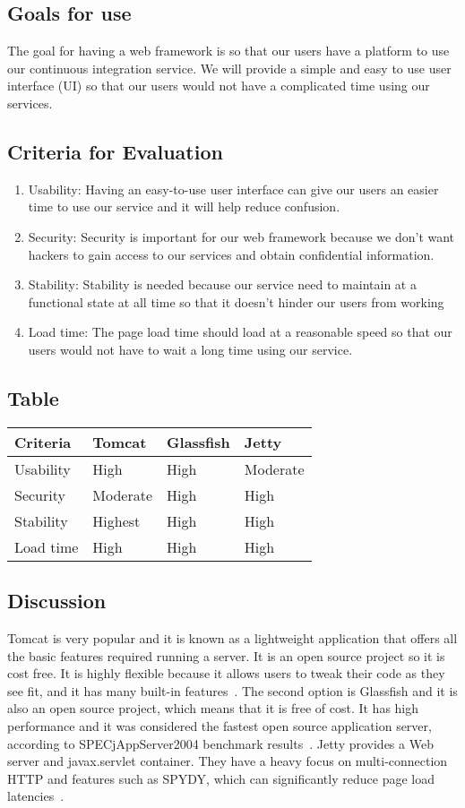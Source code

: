 \documentclass[10pt,letterpaper,onecolumn,journal]{IEEEtran}
\begin{document}
\subsection{Goals for use}
The goal for having a web framework is so that our users have a platform to use our continuous integration service.
We will provide a simple and easy to use user interface (UI) so that our users would not have a complicated time using our services.
\subsection{Criteria for Evaluation}
\begin{enumerate}
  \item Usability: Having an easy-to-use user interface can give our users an easier time to use our service and it will help reduce confusion.
  \item Security: Security is important for our web framework because we don't want hackers to gain access to our services and obtain confidential information.
  \item Stability: Stability is needed because our service need to maintain at a functional state at all time so that it doesn't hinder our users from working
  \item Load time: The page load time should load at a reasonable speed so that our users would not have to wait a long time using our service.
\end{enumerate}
\subsection{Table}
\begin{center}
  \begin{tabular}{llll}
    Criteria & Tomcat & Glassfish & Jetty \\ \midrule
    Usability       & High & High & Moderate \\ \midrule
    Security           & Moderate & High & High \\ \midrule
    Stability      & Highest & High & High \\ \midrule
    Load time  & High & High & High \\ \bottomrule
  \end{tabular}
\end{center}
\subsection{Discussion}
Tomcat is very popular and it is known as a lightweight application that offers all the basic features required running a server.
It is an open source project so it is cost free.
It is highly flexible because it allows users to tweak their code as they see fit, and it has many built-in features~\cite{tomcat}.
The second option is Glassfish and it is also an open source project, which means that it is free of cost.
It has high performance and it was considered the fastest open source application server, according to SPECjAppServer2004 benchmark results~\cite{glassfish}.
Jetty provides a Web server and javax.servlet container.
They have a heavy focus on multi-connection HTTP and features such as SPYDY, which can significantly reduce page load latencies~\cite{jetty}.
\end{document}

